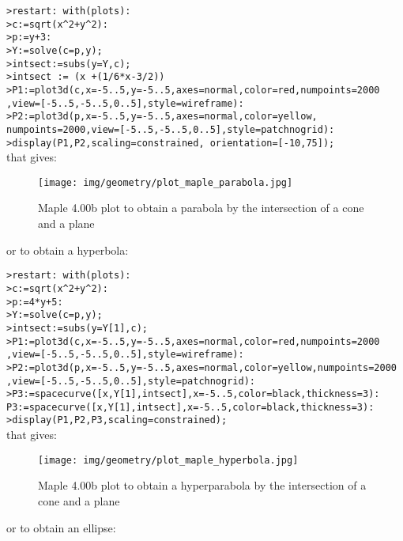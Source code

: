 \begin{enumerate}
		\texttt{>restart: with(plots):}\\
		\texttt{>c:=sqrt(x\string^2+y\string^2):}\\
		\texttt{>p:=y+3:}\\
		\texttt{>Y:=solve(c=p,y);}\\
		\texttt{>intsect:=subs(y=Y,c);}\\
		\texttt{>intsect := (x +(1/6*x-3/2))}\\
		\texttt{>P1:=plot3d(c,x=-5..5,y=-5..5,axes=normal,color=red,numpoints=2000}
		\texttt{,view=[-5..5,-5..5,0..5],style=wireframe):}\\
		\texttt{>P2:=plot3d(p,x=-5..5,y=-5..5,axes=normal,color=yellow,}\\
		\texttt{numpoints=2000,view=[-5..5,-5..5,0..5],style=patchnogrid):}\\
		\texttt{>display(P1,P2,scaling=constrained, orientation=[-10,75]);}\\
		
		that gives:
		\begin{figure}[H]
			\centering
			\texttt{[image: img/geometry/plot\_maple\_parabola.jpg]}
			\caption{Maple 4.00b plot to obtain a parabola by the intersection of a cone and a plane}
		\end{figure}
		or to obtain a hyperbola:
		
		\texttt{>restart: with(plots):}\\
		\texttt{>c:=sqrt(x\string^2+y\string^2):}\\
		\texttt{>p:=4*y+5:}\\
		\texttt{>Y:=solve(c=p,y);}\\
		\texttt{>intsect:=subs(y=Y[1],c);}\\	\texttt{>P1:=plot3d(c,x=-5..5,y=-5..5,axes=normal,color=red,numpoints=2000}\\
		\texttt{,view=[-5..5,-5..5,0..5],style=wireframe):}\\	\texttt{>P2:=plot3d(p,x=-5..5,y=-5..5,axes=normal,color=yellow,numpoints=2000}\\
		\texttt{,view=[-5..5,-5..5,0..5],style=patchnogrid):}\\	\texttt{>P3:=spacecurve([x,Y[1],intsect],x=-5..5,color=black,thickness=3):}\\
	\texttt{P3:=spacecurve([x,Y[1],intsect],x=-5..5,color=black,thickness=3):}\\
		\texttt{>display(P1,P2,P3,scaling=constrained);}\\
		
		that gives:
		\begin{figure}[H]
			\centering
			\texttt{[image: img/geometry/plot\_maple\_hyperbola.jpg]}
			\caption{Maple 4.00b plot to obtain a hyperparabola by the intersection of a cone and a plane}
		\end{figure}
		or to obtain an ellipse:
		

\end{enumerate}
